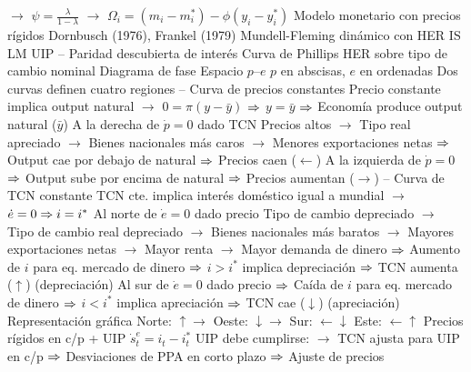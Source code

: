 \documentclass{nuevotema}
\begin{document}
\begin{esquemal}
				\4[] $\to$ $\psi = \frac{\lambda}{1-\lambda}$
				\4[] $\to$ $\Omega_i = (m_i - m_i^*) - \phi (y_i - y_i^*)$
			\3 Modelo monetario con precios rígidos
				\4 Dornbusch (1976), Frankel (1979)
				\4[] Mundell-Fleming dinámico con HER
				\4 IS
				\4[] 
				\4 LM
				\4[] 
				\4 UIP -- Paridad descubierta de interés
				\4[] 
				\4 Curva de Phillips
				\4[] 
				\4 HER sobre tipo de cambio nominal
				\4[] 
				\4 Diagrama de fase
				\4[] Espacio $p$--$e$
				\4[] $p$ en abscisas, $e$ en ordenadas
				\4 Dos curvas definen cuatro regiones
				\4[$\dot{p}=0$] -- Curva de precios constantes
				\4[] Precio constante implica output natural
				\4[] $\to$ $0=\pi(y-\bar{y})$ $\Rightarrow$ $y=\bar{y}$
				\4[] $\Rightarrow$ Economía produce output natural ($\bar{y}$)
				\4[] A la derecha de $\dot{p} = 0$ dado TCN
				\4[] Precios altos
				\4[] $\to$ Tipo real apreciado
				\4[] $\to$ Bienes nacionales más caros
				\4[] $\to$ Menores exportaciones netas
				\4[] $\Rightarrow$ Output cae por debajo de natural
				\4[] $\Rightarrow$ Precios caen ($\leftarrow$)
				\4[] A la izquierda de $\dot{p} = 0$
				\4[] $\Rightarrow$ Output sube por encima de natural
				\4[] $\Rightarrow$ Precios aumentan ($\rightarrow$)
				\4[$\dot{e} = 0$] -- Curva de TCN constante
				\4[] TCN cte. implica interés doméstico igual a mundial
				\4[] $\to$ $\dot{e}=0 \Rightarrow i = i^*$
				\4 Al norte de $\dot{e}=0$ dado precio
				\4[] Tipo de cambio depreciado
				\4[] $\to$ Tipo de cambio real depreciado
				\4[] $\to$ Bienes nacionales más baratos
				\4[] $\to$ Mayores exportaciones netas
				\4[] $\to$ Mayor renta
				\4[] $\to$ Mayor demanda de dinero
				\4[] $\Rightarrow$ Aumento de $i$ para eq. mercado de dinero
				\4[] $\Rightarrow$ $i > i^*$ implica depreciación
				\4[] $\Rightarrow$ TCN aumenta ($\uparrow$) (depreciación)
				\4 Al sur de $\dot{e}=0$ dado precio
				\4[] $\Rightarrow$ Caída de $i$ para eq. mercado de dinero
				\4[] $\Rightarrow$ $i < i^*$ implica apreciación
				\4[] $\Rightarrow$ TCN cae ($\downarrow$) (apreciación)
				\4 Representación gráfica
				\4[] Norte: $\uparrow \rightarrow$
				\4[] Oeste: $\downarrow \rightarrow$
				\4[] Sur: $\leftarrow \downarrow$
				\4[] Este: $\leftarrow \uparrow$
				\4[] 
				\4 Precios rígidos en c/p + UIP
				\4[] $\dot{s}_t^e = i_t - i_t^*$
				\4[] UIP debe cumplirse:
				\4[] $\to$ TCN ajusta para UIP en c/p
				\4[] $\Rightarrow$ Desviaciones de PPA en corto plazo
				\4[] $\Rightarrow$ Ajuste de precios

\end{esquemal}
\end{document}

